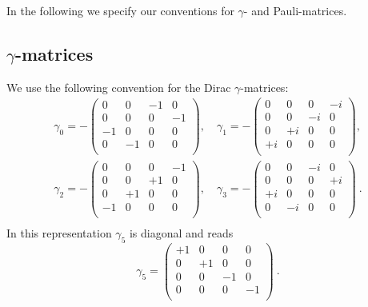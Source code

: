 \label{sec:gammas}

In the following we specify our conventions for $\gamma$- and
Pauli-matrices. 

\subsection{$\gamma$-matrices}

We use the following convention for the Dirac $\gamma$-matrices:
\[
\begin{split}
  \gamma_0 = -\begin{pmatrix}
    0 & 0 & -1 & 0 \\
    0 & 0 & 0 & -1 \\
    -1 & 0 & 0 & 0 \\
    0 & -1 & 0 & 0 \\
  \end{pmatrix},\quad
  \gamma_1 = -\begin{pmatrix}
    0 & 0 & 0 & -i \\
    0 & 0 & -i & 0 \\
    0 & +i & 0 & 0 \\
    +i & 0 & 0 & 0 \\    
  \end{pmatrix},\\
  \gamma_2 = -\begin{pmatrix}
    0 & 0 & 0 & -1 \\
    0 & 0 & +1 & 0 \\
    0 & +1 & 0 & 0 \\
    -1 & 0 & 0 & 0 \\   
  \end{pmatrix},\quad
  \gamma_3 = -\begin{pmatrix}
    0 & 0 & -i & 0 \\
    0 & 0 & 0 & +i \\
    +i & 0 & 0 & 0 \\
    0 & -i & 0 & 0 \\
  \end{pmatrix}\ .\\
\end{split}
\]
In this representation $\gamma_5$ is diagonal and reads
\[
  \gamma_5 =
  \begin{pmatrix}
    +1 & 0 & 0 & 0 \\
    0 & +1 & 0 & 0 \\
    0 & 0 & -1 & 0 \\
    0 & 0 & 0 & -1 \\    
  \end{pmatrix}\ .
\]


